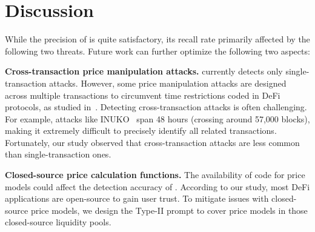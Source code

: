 \vspace{-0.5ex}
\section{Discussion}
\label{sec:discussion}

While the precision of \tool is quite satisfactory, 
its recall rate primarily affected by the following two threats. 
Future work can further optimize the following two aspects:

\noindent\textbf{Cross-transaction price manipulation attacks.} 
\tool currently detects only single-transaction attacks.
However, some price manipulation attacks are designed across multiple transactions to circumvent time restrictions coded in DeFi protocols, as studied in~\cite{chen2024demystifying}.
Detecting cross-transaction attacks is often challenging.
For example, attacks like INUKO~\cite{Inuko} span 48 hours (crossing around 57,000 blocks), making it extremely difficult to precisely identify all related transactions.
Fortunately, our study observed that cross-transaction attacks are less common than single-transaction ones.

\noindent\textbf{Closed-source price calculation functions.} 
The availability of code for price models could affect the detection accuracy of \tool.
According to our study, most DeFi applications are open-source to gain user trust.
To mitigate issues with closed-source price models, we design the Type-II prompt to cover price models in those closed-source liquidity pools.